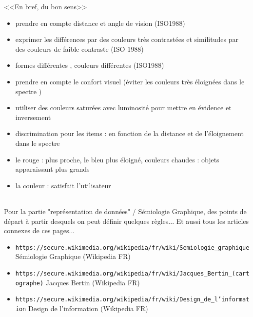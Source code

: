 \documentclass[11pt,twoside,a4paper]{article}
\begin{document}
<<En bref, du bon sens>>
\begin{itemize}
	\item prendre en compte distance et angle de vision (ISO1988)
	\item exprimer les diff{\'e}rences par des couleurs tr{\`e}s contrast{\'e}es et similitudes par des couleurs de faible contraste (ISO 1988)
	\item formes diff{\'e}rentes , couleurs diff{\'e}rentes (ISO1988)
	\item prendre en compte le confort visuel ({\'e}viter les couleurs tr{\`e}s {\'e}loign{\'e}es dans le spectre )
	\item utiliser des couleurs satur{\'e}es avec luminosit{\'e} pour mettre en {\'e}vidence et inversement
	\item discrimination pour les items : en fonction de la distance et de l'{\'e}loignement dans le spectre
	\item le rouge : plus proche, le bleu plus {\'e}loign{\'e}, couleurs chaudes : objets apparaissant plus grands
	\item la couleur : satisfait l'utilisateur
\end{itemize}~\\

Pour la partie "repr{\'e}sentation de donn{\'e}es" / S{\'e}miologie Graphique, des points de d{\'e}part {\`a} partir desquels on peut d{\'e}finir quelques r{\`e}gles... Et aussi tous les articles connexes de ces pages...
\begin{itemize}
	\item[] \texttt{https://secure.wikimedia.org/wikipedia/fr/wiki/Semiologie\_graphique} S{\'e}miologie Graphique (Wikipedia FR)
	\item[] \texttt{https://secure.wikimedia.org/wikipedia/fr/wiki/Jacques\_Bertin\_(cartographe)} Jacques Bertin (Wikipedia FR)
	\item[] \texttt{https://secure.wikimedia.org/wikipedia/fr/wiki/Design\_de\_l'information} Design de l'information (Wikipedia FR)
\end{itemize}~\\
	
\end{document}
